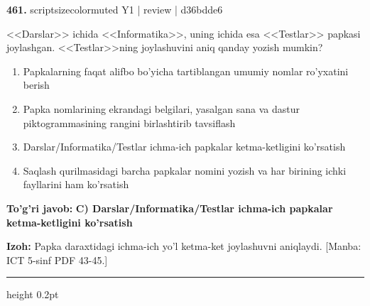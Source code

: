 \documentclass[10pt,a4paper]{article}
\begin{document}
{\bfseries\sffamily\color{ink} 461.} {scriptsizecolor{muted} Y1 | review | d36bdde6}
\par
<<Darslar>> ichida <<Informatika>>, uning ichida esa <<Testlar>> papkasi joylashgan. <<Testlar>>ning joylashuvini aniq qanday yozish mumkin?
\begin{enumerate}[label=\Alph*),leftmargin=9mm]
\item Papkalarning faqat alifbo bo'yicha tartiblangan umumiy nomlar ro'yxatini berish
\item Papka nomlarining ekrandagi belgilari, yasalgan sana va dastur piktogrammasining rangini birlashtirib tavsiflash
\item Darslar/Informatika/Testlar ichma-ich papkalar ketma-ketligini ko'rsatish
\item Saqlash qurilmasidagi barcha papkalar nomini yozish va har birining ichki fayllarini ham ko'rsatish
\end{enumerate}
\begin{tcolorbox}[enhanced,breakable,colback=teal!4,colframe=teal!60!black,boxrule=0.45pt,arc=1.2mm,left=2.7mm,right=2.7mm,top=1.8mm,bottom=1.8mm,before skip=2mm,after skip=2mm]
{\bfseries\sffamily\color{teal}To'g'ri javob:} \textbf{C) Darslar/Informatika/Testlar ichma-ich papkalar ketma-ketligini ko'rsatish}
\par\smallskip
{\bfseries Izoh:} Papka daraxtidagi ichma-ich yo'l ketma-ket joylashuvni aniqlaydi. [Manba: ICT 5-sinf PDF 43-45.]
\end{tcolorbox}
\vspace{2mm}\hrule height 0.2pt\vspace{3mm}
\end{document}

